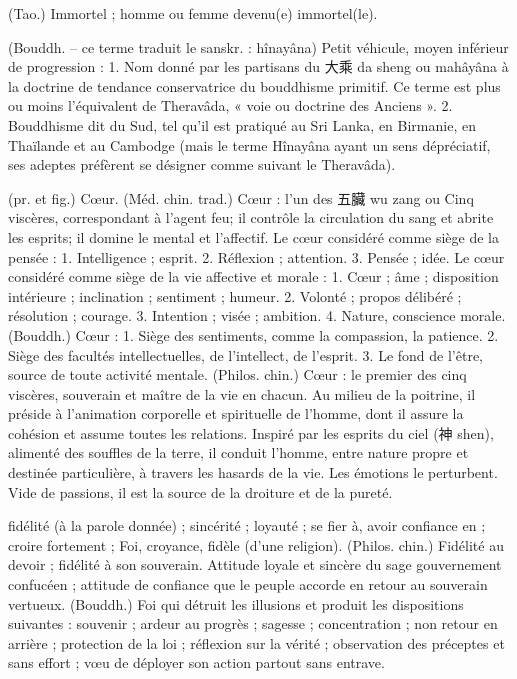 \begin{Def}[xian仙]
    (Tao.) Immortel ; homme ou femme devenu(e) immortel(le). 
\end{Def}
\begin{Def}[xiaosheng 小乘]
    (Bouddh. – ce terme traduit le sanskr. : hînayâna) Petit véhicule, moyen inférieur de progression :	1. Nom donné par les partisans du 大乘 da sheng ou mahâyâna à la doctrine de tendance conservatrice du bouddhisme primitif. Ce terme est plus ou moins l’équivalent de Theravâda, « voie ou doctrine des Anciens ». 2. Bouddhisme dit du Sud, tel qu’il est pratiqué au Sri Lanka, en Birmanie, en Thaïlande et au Cambodge (mais le terme Hînayâna ayant un sens dépréciatif, ses adeptes préfèrent se désigner comme suivant le Theravâda).
\end{Def}
\begin{Def}[xin 心]
    (pr. et fig.) Cœur.	    (Méd. chin. trad.) Cœur : l’un des 五臟 wu zang ou Cinq viscères, correspondant à l’agent feu; il contrôle la circulation du sang et abrite les esprits; il domine le mental et l’affectif. Le cœur considéré comme siège de la pensée : 1. Intelligence ; esprit. 2. Réflexion ; attention. 3. Pensée ; idée. Le cœur considéré comme siège de la vie affective et morale : 1. Cœur ; âme ; disposition intérieure ; inclination ; sentiment ; humeur. 2. Volonté ; propos délibéré ; résolution ; courage. 3. Intention ; visée ; ambition. 4. Nature, conscience morale. (Bouddh.) Cœur : 1. Siège des sentiments, comme la compassion, la patience. 2. Siège des facultés intellectuelles, de l’intellect, de l’esprit. 3. Le fond de l’être, source de toute activité mentale.  (Philos. chin.) Cœur : le premier des cinq viscères, souverain et maître de la vie en chacun. Au milieu de la poitrine, il préside à l’animation corporelle et spirituelle de l’homme, dont il assure la cohésion et assume toutes les relations. Inspiré par les esprits du ciel (神 shen), alimenté des souffles de la terre, il conduit l’homme, entre nature propre et destinée particulière, à travers les hasards de la vie. Les émotions le perturbent. Vide de passions, il est la source de la droiture et de la pureté.
\end{Def}
\begin{Def}[xin信]
   fidélité (à la parole donnée) ; sincérité ; loyauté ; se fier à, avoir confiance en ; croire fortement ; Foi, croyance, fidèle (d’une religion).     (Philos. chin.) Fidélité au devoir ; fidélité à son souverain. Attitude loyale et sincère du sage gouvernement confucéen ; attitude de confiance que le peuple accorde en retour au souverain vertueux.     (Bouddh.) Foi qui détruit les illusions et produit les dispositions suivantes : souvenir ; ardeur au progrès ; sagesse ; concentration ; non retour en arrière ; protection de la loi ; réflexion sur la vérité ; observation des préceptes et sans effort ; vœu de déployer son action partout sans entrave. 
\end{Def}
